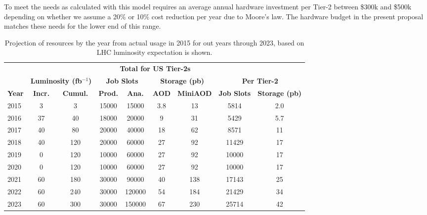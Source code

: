 \documentclass[11pt,a4paper]{article}
\begin{document}
To meet the needs as calculated with this model requires an average annual hardware 
investment per Tier-2 between \$300k and \$500k depending on whether we assume a 
20\% or 10\% cost reduction per year due to Moore's law. The hardware budget in the present
proposal matches these needs for the lower end of this range. 

\begin{table}
\begin{center}
\begin{tabular}{|l|c|c|c|c|c|c|c|c|}
\hline
&\multicolumn{2}{|c|}{ } &\multicolumn{4}{|c|}{\bf Total for US Tier-2s}&\multicolumn{2}{|c|}{ } \\ \cline{4-7}
&\multicolumn{2}{|c|}{\bf Luminosity (fb$^{-1}$)}&\multicolumn{2}{|c|}{\bf Job Slots}&\multicolumn{2}{|c|}{\bf Storage (pb)}&\multicolumn{2}{|c|}{\bf Per Tier-2} \\ \cline{2-9}
{\bf Year}&{\bf Incr.}&{\bf Cumul.}&{\bf Prod.}&{\bf Ana.}&{\bf AOD}&{\bf MiniAOD}&{\bf Job Slots}&{\bf Storage (pb)} \\  \hline
2015&    3&   3& 15000&   15000& 3.8&  13&   5814&   2.0 \\ \hline
2016&   37&  40& 18000&   20000&   9&  31&   5429&   5.7 \\ \hline
2017&   40&  80& 20000&   40000&  18&  62&   8571&    11 \\ \hline
2018&   40& 120& 20000&   60000&  27&  92&  11429&    17 \\ \hline
2019&    0& 120& 10000&   60000&  27&  92&  10000&    17 \\ \hline
2020&    0& 120& 10000&   60000&  27&  92&  10000&    17 \\ \hline
2021&   60& 180& 30000&   90000&  40& 138&  17143&    25 \\ \hline
2022&   60& 240& 30000&  120000&  54& 184&  21429&    34 \\ \hline
2023&   60& 300& 30000&  150000&  67& 230&  25714&    42 \\ \hline
\end{tabular}
\caption[]
{
Projection of resources by the year from actual usage in 2015 for
out years through 2023, based on LHC luminosity expectation is
shown. 
}
\label{projection}
\end{center}
\end{table}
\end{document}
